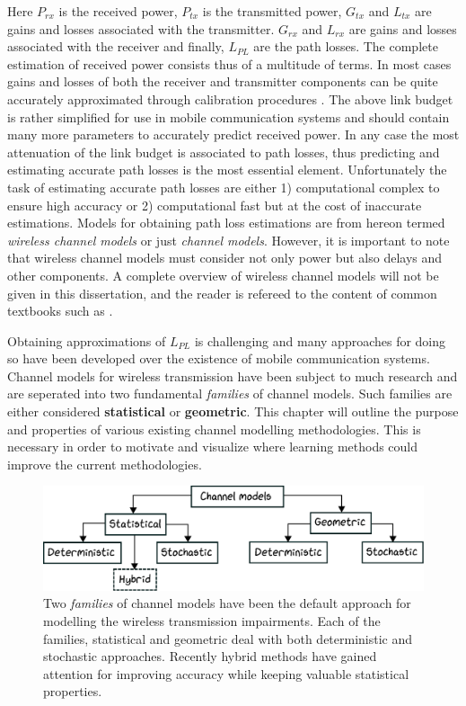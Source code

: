 Here $P_{rx}$ is the received power, $P_{tx}$ is the transmitted power, $G_{tx}$ and $L_{tx}$ are gains and losses associated with the transmitter. $G_{rx}$ and $L_{rx}$ are gains and losses associated with the receiver and finally, $L_{PL}$ are the path losses. The complete estimation of received power consists thus of a multitude of terms. In most cases gains and losses of both the receiver and transmitter components can be quite accurately approximated through calibration procedures  \cite{Molisch2007}. The above link budget is rather simplified for use in mobile communication systems and should contain many more parameters to accurately predict received power. In any case the most attenuation of the link budget is associated to path losses, thus predicting and estimating accurate path losses is the most essential element. Unfortunately the task of estimating accurate path losses are either 1) computational complex to ensure high accuracy or 2) computational fast but at the cost of inaccurate estimations. Models for obtaining path loss estimations are from hereon termed \emph{wireless channel models} or just \emph{channel models}. However, it is important to note that wireless channel models must consider not only power but also delays and other components. A complete overview of wireless channel models will not be given in this dissertation, and the reader is refereed to the content of common textbooks such as \cite{Tse2005FundamentalsCommunication}.

Obtaining approximations of $L_{PL}$ is challenging and many approaches for doing so have been developed over the existence of mobile communication systems. Channel models for wireless transmission have been subject to much research and are seperated into two fundamental \emph{families} of channel models. Such families are either considered \textbf{statistical} or \textbf{geometric}. This chapter will outline the purpose and properties of various existing channel modelling methodologies. This is necessary in order to motivate and visualize where learning methods could improve the current methodologies.

\begin{figure}[thbp]
    \centering
    \includegraphics[width=\textwidth]{chapters/part_pathloss/figures/channelmodel_tree.eps}
    \caption{Two \emph{families} of channel models have been the default approach for modelling the wireless transmission impairments. Each of the families, statistical and geometric deal with both deterministic and stochastic approaches. Recently hybrid methods have gained attention for improving accuracy while keeping valuable statistical properties.}
    \label{fig:channel_models}
\end{figure}



